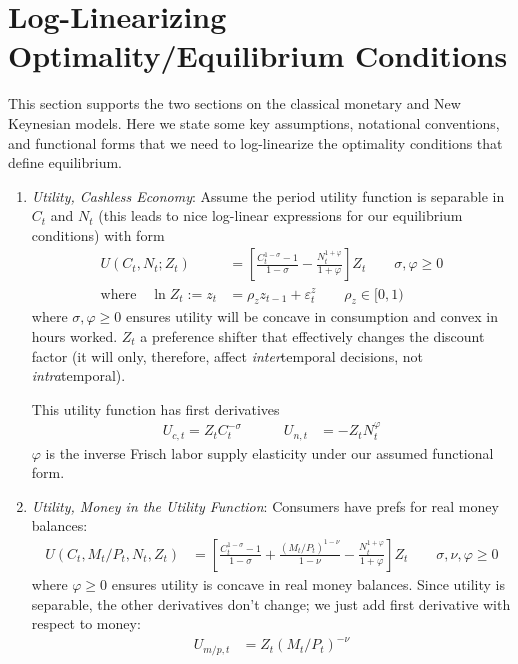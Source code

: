 \documentclass[12pt]{article}
\theoremstyle{plain}
\theoremstyle{definition}
\theoremstyle{remark}
\begin{document}

\appendix
\clearpage
\section{Log-Linearizing Optimality/Equilibrium Conditions}

This section supports the two sections on the classical monetary and New
Keynesian models.
Here we state some key assumptions, notational conventions, and
functional forms that we need to log-linearize the optimality conditions
that define equilibrium.
\begin{enumerate}
  \item \emph{Utility, Cashless Economy}:
    Assume the period utility function is separable in $C_t$ and $N_t$
    (this leads to nice log-linear expressions for our equilibrium
    conditions) with form
    \begin{align*}
      U(C_t,N_t;Z_t) &=
      \left[
        \frac{C_t^{1-\sigma}-1}{1-\sigma}
        -
        \frac{N_t^{1+\varphi}}{1+\varphi}
      \right] Z_t
      \qquad \sigma,\varphi \geq 0 \\
      \text{where}\quad
      \ln Z_t :=
      z_t &= \rho_z z_{t-1} + \varepsilon_t^z
      \qquad \rho_z\in[0,1)
    \end{align*}
    where $\sigma,\varphi\geq 0$ ensures utility will be concave in
    consumption and convex in hours worked.
    $Z_t$ a preference shifter that effectively changes the discount
    factor (it will only, therefore, affect \emph{inter}temporal
    decisions, not \emph{intra}temporal).

    This utility function has first derivatives
    \begin{align*}
      U_{c,t} = Z_t C_t^{-\sigma}
      \qquad\quad
      U_{n,t} &= -Z_t N_t^{\varphi}
    \end{align*}
    $\varphi$ is the inverse Frisch labor supply elasticity under our
    assumed functional form.


  \item \emph{Utility, Money in the Utility Function}:
    Consumers have prefs for real money balances:
    \begin{align*}
      U(C_t,M_t/P_t,N_t,Z_t) &=
      \left[
        \frac{C_t^{1-\sigma}-1}{1-\sigma}
        + \frac{(M_t/P_t)^{1-\nu}}{1-\nu}
        - \frac{N_t^{1+\varphi}}{1+\varphi}
      \right] Z_t
      \qquad \sigma,\nu,\varphi \geq 0
    \end{align*}
    where $\varphi\geq 0$ ensures utility is concave in real money
    balances.
    Since utility is separable, the other derivatives don't change; we
    just add first derivative with respect to money:
    \begin{align*}
      U_{m/p,t} &= Z_t (M_t/P_t)^{-\nu}
    \end{align*}


\end{enumerate}
\end{document}

